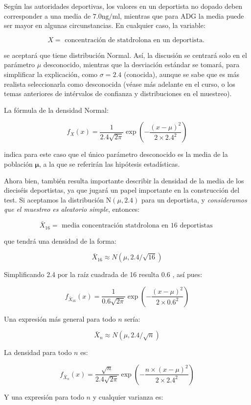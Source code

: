 \documentclass[
]{article}
\begin{document}
Según las autoridades deportivas, los valores en un deportista no dopado deben corresponder a una media de \(7.0 \mathrm{ng} / \mathrm{ml}\), mientras que para ADG la media puede ser mayor en algunas circunstancias. En cualquier caso, la variable:

\[
X=\text { concentración de statdrolona en un deportista. }
\]

se aceptará que tiene distribución Normal. Así, la discusión se centrará solo en el parámetro \(\mu\) desconocido, mientras que la desviación estándar se tomará, para simplificar la explicación, como \(\sigma=2.4\) (conocida), aunque se sabe que es más realista seleccionarla como desconocida (véase más adelante en el curso, o los temas anteriores de intérvalos de confianza y distribuciones en el muestreo).

La fórmula de la densidad Normal:

\[
f_{X}(x)=\frac{1}{2.4 \sqrt{2 \pi}} \exp \left(-\frac{(x-\mu)^{2}}{2 \times 2.4^{2}}\right)
\]

indica para este caso que el único parámetro desconocido es la media de la población \(\boldsymbol{\mu}\), a la que se referirán las hipótesis estadísticas.

Ahora bien, también resulta importante describir la densidad de la media de los dieciséis deportistas, ya que jugará un papel importante en la construcción del test. Si aceptamos la distribución \(\mathrm{N}(\mu, 2.4)\) para un deportista, y \emph{consideramos que el muestreo es aleatorio simple}, entonces:

\[
\bar{X}_{16}=\text { media concentración statdrolona en } 16 \text { deportistas }
\]

que tendrá una densidad de la forma:

\[
\bar{X}_{16} \approx N(\mu, 2.4 / \sqrt{16})
\]

Simplificando 2.4 por la raíz cuadrada de 16 resulta 0.6 , así pues:

\[
f_{\bar{X}_{16}}(x)=\frac{1}{0.6 \sqrt{2 \pi}} \exp \left(-\frac{(x-\mu)^{2}}{2 \times 0.6^{2}}\right)
\]

Una expresión más general para todo \(n\) sería:

\[
\bar{X}_{n} \approx N(\mu, 2.4 / \sqrt{n})
\]

La densidad para todo \(n\) es:

\[
f_{\bar{X}_{n}}(x)=\frac{\sqrt{n}}{2.4 \sqrt{2 \pi}} \exp \left(-\frac{n \times(x-\mu)^{2}}{2 \times 2.4^{2}}\right)
\]

Y una expresión para todo \(n\) y cualquier varianza es:
\end{document}
